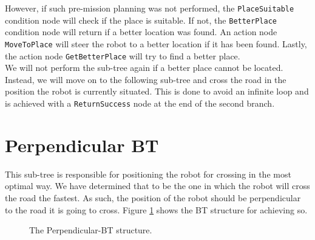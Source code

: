    However, if such pre-mission planning was not performed, the \texttt{PlaceSuitable} condition node will check if the place is suitable. If not, the \texttt{BetterPlace} condition node will return if a better location was found. An action node \texttt{MoveToPlace} will steer the robot to a better location if it has been found. Lastly, the action node \texttt{GetBetterPlace} will try to find a better place.\\
    We will not perform the sub-tree again if a better place cannot be located. Instead, we will move on to the following sub-tree and cross the road in the position the robot is currently situated. This is done to avoid an infinite loop and is achieved with a \texttt{ReturnSuccess} node at the end of the second branch.\\

\section{Perpendicular BT}
\label{sec:Perpendicular-BT}
    This sub-tree is responsible for positioning the robot for crossing in the most optimal way. We have determined that to be the one in which the robot will cross the road the fastest. As such, the position of the robot should be perpendicular to the road it is going to cross. Figure \ref{fig:Perpendicular-BT} shows the BT structure for achieving so.\\
    \begin{figure}[ht]
        \caption{The Perpendicular-BT structure.}
        \label{fig:Perpendicular-BT}
    \end{figure}
